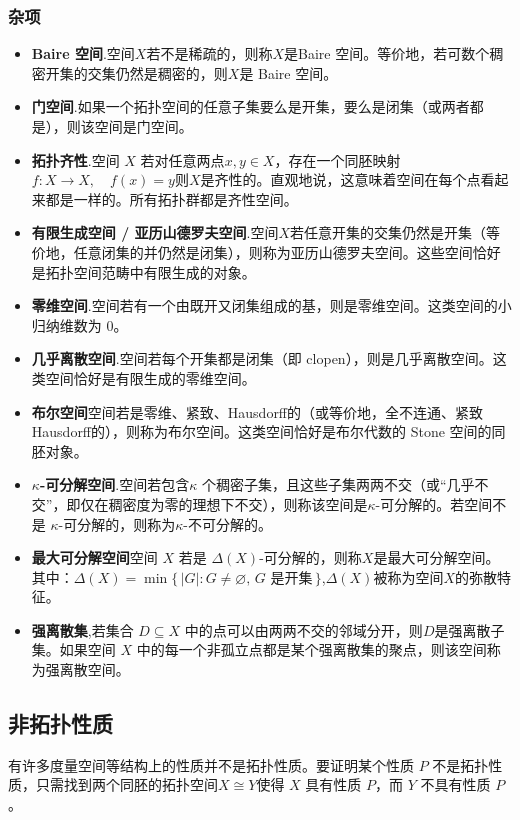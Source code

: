 \subsubsection{杂项}
\begin{itemize}
\item \textbf{Baire 空间}.空间$X$若不是稀疏的，则称$X$是Baire 空间。等价地，若可数个稠密开集的交集仍然是稠密的，则$X$是 Baire 空间。
\item \textbf{门空间}.如果一个拓扑空间的任意子集要么是开集，要么是闭集（或两者都是），则该空间是门空间。

\item \textbf{拓扑齐性}.空间 $X$ 若对任意两点$x, y \in X$，存在一个同胚映射$f: X \to X,\quad f(x) = y$则$X$是齐性的。直观地说，这意味着空间在每个点看起来都是一样的。所有拓扑群都是齐性空间。
\item \textbf{有限生成空间 / 亚历山德罗夫空间}.空间$X$若任意开集的交集仍然是开集（等价地，任意闭集的并仍然是闭集），则称为亚历山德罗夫空间。这些空间恰好是拓扑空间范畴中有限生成的对象。
\item \textbf{零维空间}.空间若有一个由既开又闭集组成的基，则是零维空间。这类空间的小归纳维数为 0。
\item \textbf{几乎离散空间}.空间若每个开集都是闭集（即 clopen），则是几乎离散空间。这类空间恰好是有限生成的零维空间。
\item \textbf{布尔空间}空间若是零维、紧致、Hausdorff的（或等价地，全不连通、紧致Hausdorff的），则称为布尔空间。这类空间恰好是布尔代数的 Stone 空间的同胚对象。
\item \textbf{$\kappa$-可分解空间}.空间若包含$\kappa$ 个稠密子集，且这些子集两两不交（或“几乎不交”，即仅在稠密度为零的理想下不交），则称该空间是$\kappa$-可分解的。若空间不是 $\kappa$-可分解的，则称为$\kappa$-不可分解的。
\item \textbf{最大可分解空间}空间 $X$ 若是 $\Delta(X)$-可分解的，则称$X$是最大可分解空间。其中：$\Delta(X) = \min\{\,|G| : G \neq \varnothing, \, G \text{ 是开集}\,\}$,$\Delta(X)$被称为空间$X$的弥散特征。
\item \textbf{强离散集},若集合 $D \subseteq X$ 中的点可以由两两不交的邻域分开，则$D$是强离散子集。如果空间 $X$ 中的每一个非孤立点都是某个强离散集的聚点，则该空间称为强离散空间。
\end{itemize}
\subsection{非拓扑性质}
有许多度量空间等结构上的性质并不是拓扑性质。要证明某个性质 $P$ 不是拓扑性质，只需找到两个同胚的拓扑空间$X \cong Y$使得 $X$ 具有性质 $P$，而 $Y$ 不具有性质 $P$。

